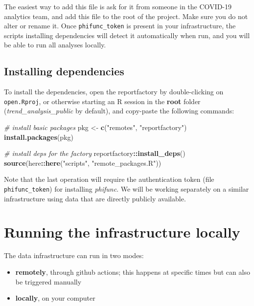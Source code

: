 \documentclass[]{book}
\newenvironment{Shaded}{\begin{snugshade}}{\end{snugshade}}
\newcommand{\CommentTok}[1]{\textcolor[rgb]{0.56,0.35,0.01}{\textit{#1}}}
\newcommand{\KeywordTok}[1]{\textcolor[rgb]{0.13,0.29,0.53}{\textbf{#1}}}
\newcommand{\NormalTok}[1]{#1}
\newcommand{\OperatorTok}[1]{\textcolor[rgb]{0.81,0.36,0.00}{\textbf{#1}}}
\newcommand{\StringTok}[1]{\textcolor[rgb]{0.31,0.60,0.02}{#1}}
\begin{document}
The easiest way to add this file is ask for it from someone in the COVID-19
analytics team, and add this file to the root of the project. Make sure you do
not alter or rename it. Once \texttt{phifunc\_token} is present in your infrastructure,
the scripts installing dependencies will detect it automatically when run, and
you will be able to run all analyses locally.

\hypertarget{installing-dependencies}{%
\subsection{Installing dependencies}\label{installing-dependencies}}

To install the dependencies, open the reportfactory by double-clicking on
\texttt{open.Rproj}, or otherwise starting an R session in the \textbf{root} folder
(\emph{trend\_analysis\_public} by default), and copy-paste the following commands:

\begin{Shaded}
\begin{Highlighting}[]

\CommentTok{# install basic packages}
\NormalTok{pkg <-}\StringTok{ }\KeywordTok{c}\NormalTok{(}\StringTok{"remotes"}\NormalTok{, }\StringTok{"reportfactory"}\NormalTok{)}
\KeywordTok{install.packages}\NormalTok{(pkg)}

\CommentTok{# install deps for the factory}
\NormalTok{reportfactory}\OperatorTok{::}\KeywordTok{install_deps}\NormalTok{()}
\KeywordTok{source}\NormalTok{(here}\OperatorTok{::}\KeywordTok{here}\NormalTok{(}\StringTok{"scripts"}\NormalTok{, }\StringTok{"remote_packages.R"}\NormalTok{))}
\end{Highlighting}
\end{Shaded}

Note that the last operation will require the authentication token (file
\texttt{phifunc\_token}) for installing \emph{phifunc}. We will be working separately on a
similar infrastructure using data that are directly publicly available.

\hypertarget{running-the-infrastructure-locally}{%
\section{Running the infrastructure locally}\label{running-the-infrastructure-locally}}

The data infrastructure can run in two modes:

\begin{itemize}
\item
  \textbf{remotely}, through github actions; this happens at specific times but can also
  be triggered manually
\item
  \textbf{locally}, on your computer
\end{itemize}
\end{document}
